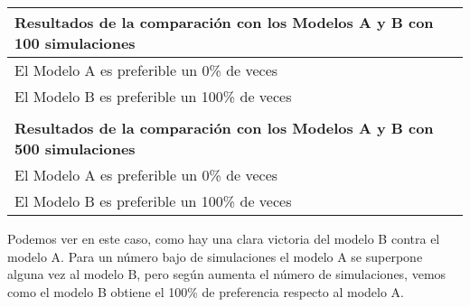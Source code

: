 \begin{table}[H]
\begin{tabular}{|l|}
 \\ \hline
\textbf{Resultados de la comparación con los Modelos A  y B con 100 simulaciones} \\ \hline
El Modelo A es preferible un 0\% de veces \\ \hline
El Modelo B es preferible un 100\% de veces \\ \hline
 \\ \hline
\textbf{Resultados de la comparación con los Modelos A  y B con 500 simulaciones} \\ \hline
El Modelo A es preferible un 0\% de veces \\ \hline
El Modelo B es preferible un 100\% de veces \\ \hline
\end{tabular}
\end{table}

Podemos ver en este caso, como hay una clara victoria del modelo B contra el modelo A. Para un número bajo de simulaciones el modelo A se superpone alguna vez al modelo B, pero según aumenta el número de simulaciones, vemos como el modelo B obtiene el 100\% de preferencia respecto al modelo A.

